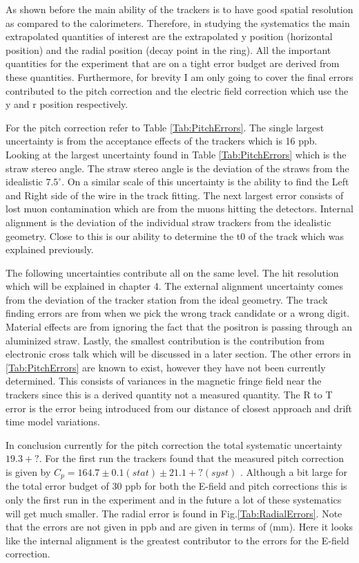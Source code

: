 \documentclass[./Thesis]{subfiles}
\begin{document}
	As shown before the main ability of the trackers is to have good spatial resolution as compared to the calorimeters.  Therefore, in studying the systematics the main extrapolated quantities of interest are the extrapolated y position (horizontal position) and the radial position (decay point in the ring).  All the important quantities for the experiment that are on a tight error budget are derived from these quantities.  Furthermore, for brevity I am only going to cover the final errors contributed to the pitch correction and the electric field correction which use the y and r position respectively. 

	For the pitch correction refer to Table \ref{Tab:PitchErrors}. The single largest uncertainty is from the acceptance effects of the trackers which is 16 ppb. Looking at the largest uncertainty found in Table \ref{Tab:PitchErrors} which is the straw stereo angle.  The straw stereo angle is the deviation of the straws from the idealistic $7.5^\circ$.  On a similar scale of this uncertainty is the ability to find the Left and Right side of the wire in the track fitting.  The next largest error consists of lost muon contamination which are from the muons hitting the detectors.  Internal alignment is the deviation of the individual straw trackers from the idealistic geometry.  Close to this is our ability to determine the t0 of the track which was explained previously. 

	 The following uncertainties contribute all on the same level.  The hit resolution which will be explained in chapter 4.  The external alignment uncertainty comes from the deviation of the tracker station from the ideal geometry.  The track finding errors are from when we pick the wrong track candidate or a wrong digit.  Material effects are from ignoring the fact that the positron is passing through an aluminized straw.  Lastly, the smallest contribution is the contribution from electronic cross talk which will be discussed in a later section.  The other errors in \ref{Tab:PitchErrors} are known to exist, however they have not been currently determined.  This consists of variances in the magnetic fringe field near the trackers since this is a derived quantity not a measured quantity.  The R to T error is the error being introduced from our distance of closest approach and drift time model variations.  \cite{jMottpitch}
	
		In conclusion currently for the pitch correction the total systematic uncertainty $19.3+?$.  For the first run the trackers found that the measured pitch correction is given by $C_p=164.7\pm0.1(stat)\pm21.1+?(syst)$ \cite{jMottpitch}. Although a bit large for the total error budget of 30 ppb for both the E-field and pitch corrections this is only the first run in the experiment and in the future a lot of these systematics will get much smaller. The radial error is found in Fig.\ref{Tab:RadialErrors}.  Note that the errors are not given in ppb and are given in terms of (mm).  Here it looks like the internal alignment is the greatest contributor to the errors for the E-field correction.
	
\end{document}

